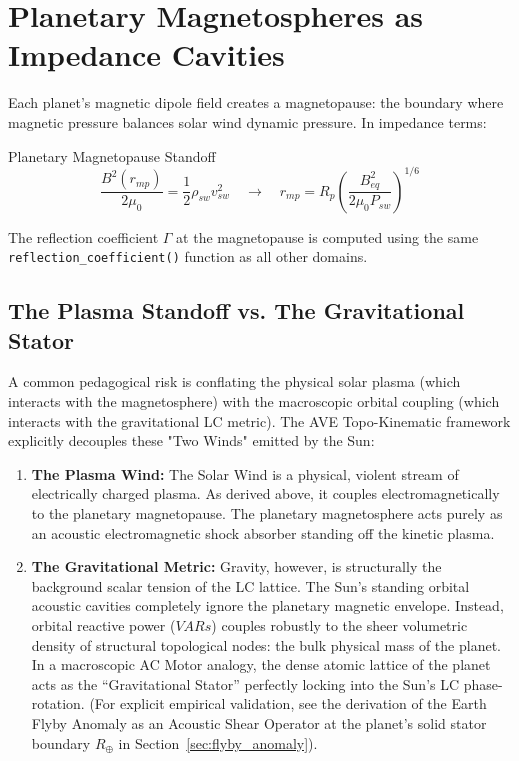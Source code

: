 \section{Planetary Magnetospheres as Impedance Cavities}
\label{sec:planetary_magnetosphere}

Each planet's magnetic dipole field creates a magnetopause:
the boundary where magnetic pressure balances solar wind
dynamic pressure.  In impedance terms:
\begin{resultbox}{Planetary Magnetopause Standoff}
\begin{equation}
    \frac{B^2(r_{mp})}{2\mu_0} = \frac{1}{2}\rho_{sw} v_{sw}^2
    \quad\longrightarrow\quad
    r_{mp} = R_p \left(\frac{B_{eq}^2}{2\mu_0 P_{sw}}\right)^{1/6}
    \label{eq:magnetopause}
\end{equation}
\end{resultbox}
The reflection coefficient $\Gamma$ at the magnetopause is computed
using the same \texttt{reflection\_\allowbreak coefficient()} function as all
other domains.

\subsection{The Plasma Standoff vs. The Gravitational Stator}

A common pedagogical risk is conflating the physical solar plasma (which interacts with the magnetosphere) with the macroscopic orbital coupling (which interacts with the gravitational LC metric). The AVE Topo-Kinematic framework explicitly decouples these "Two Winds" emitted by the Sun:

\begin{enumerate}
    \item \textbf{The Plasma Wind:} The Solar Wind is a physical, violent stream of electrically charged plasma. As derived above, it couples electromagnetically to the planetary magnetopause. The planetary magnetosphere acts purely as an acoustic electromagnetic shock absorber standing off the kinetic plasma.
    \item \textbf{The Gravitational Metric:} Gravity, however, is structurally the background scalar tension of the LC lattice. The Sun's standing orbital acoustic cavities completely ignore the planetary magnetic envelope. Instead, orbital reactive power ($VARs$) couples robustly to the sheer volumetric density of structural topological nodes: the bulk physical mass of the planet. In a macroscopic AC Motor analogy, the dense atomic lattice of the planet acts as the ``Gravitational Stator'' perfectly locking into the Sun's LC phase-rotation. (For explicit empirical validation, see the derivation of the Earth Flyby Anomaly as an Acoustic Shear Operator at the planet's solid stator boundary $R_\oplus$ in Section~\ref{sec:flyby_anomaly}).
\end{enumerate}

